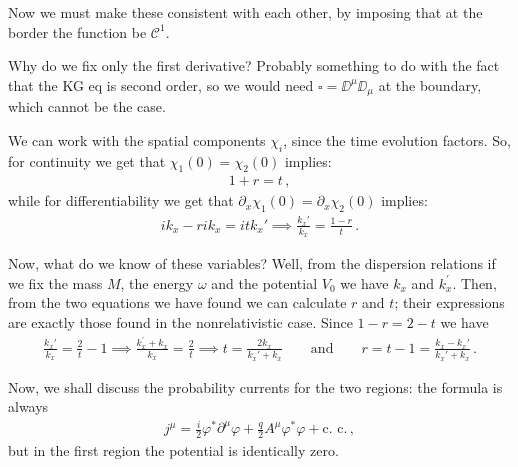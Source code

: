 \documentclass[main.tex]{subfiles}
\begin{document}
Now we must make these consistent with each other, by imposing that at the border the function be \(\mathcal{C}^{1}\). 

Why do we fix only the first derivative? Probably something to do with the fact that the KG eq is second order, so we would need \(\square = \DD^{\mu } \DD_{\mu }\) at the boundary, which cannot be the case.

We can work with the spatial components \(\chi_{i}\), since the time evolution factors. So, for continuity we get that \(\chi_1 (0) = \chi_2 (0)\) implies:
%
\begin{align}
1+r = t
\,,
\end{align}
%
while for differentiability we get that \(\partial_{x} \chi_1(0) = \partial_{x} \chi_2 (0)\) implies:
%
\begin{align}
i k_x  - r i k_x = i t k_x'
\implies
\frac{k_x'}{k_x} = \frac{1- r}{t}
\,.
\end{align}

Now, what do we know of these variables? Well, from the dispersion relations if we fix the mass \(M\), the energy \(\omega \) and the potential \(V_0 \) we have \(k_x\) and  \(k_x^{\prime }\). 
Then, from the two equations we have found we can calculate \(r\) and \(t\); their expressions are exactly those found in the nonrelativistic case. Since \(1-r = 2-t\) we have 
%
\begin{align}
\frac{k_{x}'}{k_x} = \frac{2}{t} - 1 \implies 
\frac{k_x^{\prime } + k_x}{k_x} = \frac{2}{t}
\implies t = \frac{2 k_x}{k_x' + k_x}
\qquad \text{and} \qquad
r = t-1 = \frac{k_x - k_x'}{k_x' + k_x}
\,.
\end{align}

Now, we shall discuss the probability currents for the two regions: the formula is always 
%
\begin{align}
j^{\mu } = \frac{i}{2} \varphi^{*} \partial^{\mu } \varphi  + \frac{q}{2} A^{\mu } \varphi^{*} \varphi  + \text{c. c.}
\,,
\end{align}
but in the first region the potential is identically zero. 
\end{document}
